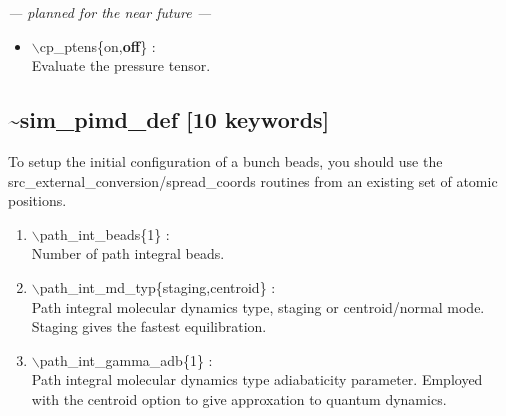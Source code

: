 \documentclass[12pt,titlepage]{article}
\begin{document}
 \vspace{0.15in} 
{\it
--- planned for the near future ---\\
\vspace{0.15in} 
\begin{itemize}
 \item  $\backslash$cp\_ptens\{on,{\bf off}\} : \\
      Evaluate the pressure tensor. 
      \end{itemize}
}

\newpage
\subsection*{\bf \~{}sim\_pimd\_def [10 keywords]}

To setup the initial configuration of a bunch beads, you should use the\\
 src\_external\_conversion/spread\_coords routines from an existing set of atomic positions.

\begin{enumerate}

 \vspace{0.15in} 
 \item  $\backslash$path\_int\_beads\{1\} : \\
     Number of path integral beads.

 \vspace{0.15in} 
 \item  $\backslash$path\_int\_md\_typ\{staging,centroid\} : \\
     Path integral molecular dynamics type, staging or centroid/normal mode.
     Staging gives the fastest equilibration.

 \vspace{0.15in} 
 \item  $\backslash$path\_int\_gamma\_adb\{1\} : \\
     Path integral molecular dynamics type adiabaticity parameter.
     Employed with the centroid option to give approxation to quantum dynamics.




\end{enumerate}
\end{document}

